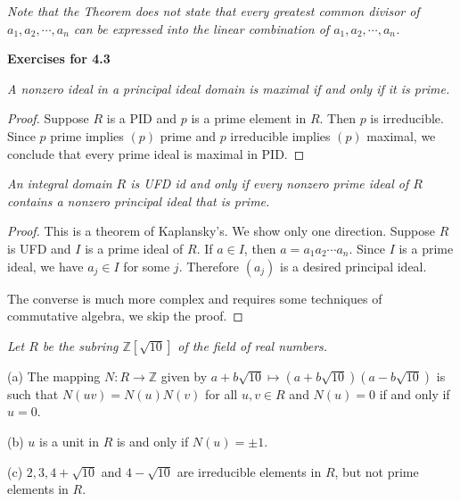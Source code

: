 \begin{note}\em
Note that the Theorem does not state that every greatest common divisor of $a_1,a_2,\cdots,a_n$ can be expressed into the linear combination of $a_1,a_2,\cdots,a_n$.
\end{note}
\begin{center}
\begin{large}
    \textbf{Exercises for 4.3}
\end{large}
\end{center}
\begin{problem}\em
A nonzero ideal in a principal ideal domain is maximal if and only if it is prime.
\end{problem}
\begin{proof}
Suppose $R$ is a PID and $p$ is a prime element in $R$. Then $p$ is irreducible. Since $p$ prime implies $(p)$ prime and $p$ irreducible implies $(p)$ maximal, we conclude that every prime ideal is maximal in PID.
\end{proof}
\begin{problem}\em
An integral domain $R$ is UFD id and only if every nonzero prime ideal of $R$ contains a nonzero principal ideal that is prime.
\end{problem}
\begin{proof}
This is a theorem of Kaplansky's. We show only one direction. Suppose $R$ is UFD and $I$ is a prime ideal of $R$. If $a\in I$, then $a=a_1a_2\cdots a_n$. Since $I$ is a prime ideal, we have $a_j\in I$ for some $j$. Therefore $(a_j)$ is a desired principal ideal.\par
The converse is much more complex and requires some techniques of commutative algebra, we skip the proof.
\end{proof}
\begin{problem}\em
Let $R$ be the subring $\mathbb{Z}[\sqrt{10}]$ of the field of real numbers.\par
(a) The mapping $N:R\to\mathbb{Z}$ given by $a+b\sqrt{10}\mapsto(a+b\sqrt{10})(a-b\sqrt{10})$ is such that $N(uv)=N(u)N(v)$ for all $u,v\in R$ and $N(u)=0$ if and only if $u=0$.\par
(b) $u$ is a unit in $R$ is and only if $N(u)=\pm1$.\par
(c) $2,3,4+\sqrt{10}$ and $4-\sqrt{10}$ are irreducible elements in $R$, but not prime elements in $R$.
\end{problem}
